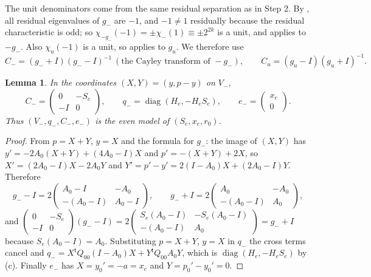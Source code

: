 \documentclass[11pt,oneside,notitlepage]{book}
\numberwithin{equation}{section}
\theoremstyle{plain}
\newtheorem{lemma}[theorem]{Lemma}
\theoremstyle{definition}
\newcommand{\diag}{\operatorname{diag}}
\begin{document}
The unit denominators come from the same residual separation as in Step 2. By , all residual eigenvalues of $g_-$ are $-1$, and $-1\ne1$ residually because the residual characteristic is odd; so $\chi_{-g_-}(-1)=\pm\chi_-(1)\equiv\pm2^{2k}$ is a unit, and  applies to $-g_-$. Also $\chi_u(-1)$ is a unit, so  applies to $g_u$. We therefore use
\[C_-=(g_-+I)(g_--I)^{-1}\ (\text{the Cayley transform of }-g_-),\qquad C_u=(g_u-I)(g_u+I)^{-1}.\]

\begin{lemma}\label{lem:Cminus}
In the coordinates $(X,Y)=(y,p-y)$ on $V_-$,
\[C_-=\begin{pmatrix}0&-S_e\\-I&0\end{pmatrix},\qquad q_-=\diag(H_e,-H_eS_e),\qquad e_-=\begin{pmatrix}x_e\\0\end{pmatrix}.\]
Thus $(V_-,q_-,C_-,e_-)$ is the even model of $(S_e,x_e,r_0)$.
\end{lemma}
\begin{proof}
From $p=X+Y$, $y=X$ and the formula for $g_-$: the image of $(X,Y)$ has $y'=-2A_0(X+Y)+(4A_0-I)X$ and $p'=-(X+Y)+2X$, so $X'=(2A_0-I)X-2A_0Y$ and $Y'=p'-y'=2(I-A_0)X+(2A_0-I)Y$. Therefore
\[g_--I=2\begin{pmatrix}A_0-I&-A_0\\-(A_0-I)&A_0-I\end{pmatrix},\qquad g_-+I=2\begin{pmatrix}A_0&-A_0\\-(A_0-I)&A_0\end{pmatrix},\]
and $\left(\begin{smallmatrix}0&-S_e\\-I&0\end{smallmatrix}\right)(g_--I)=2\left(\begin{smallmatrix}S_e(A_0-I)&-S_e(A_0-I)\\-(A_0-I)&A_0\end{smallmatrix}\right)=g_-+I$ because $S_e(A_0-I)=A_0$. Substituting $p=X+Y$, $y=X$ in $q_-$ the cross terms cancel and $q_-=X^{\mathsf t}Q_{00}(I-A_0)X+Y^{\mathsf t}Q_{00}A_0Y$, which is $\diag(H_e,-H_eS_e)$ by (c). Finally $e_-$ has $X=y_0'=-a=x_e$ and $Y=p_0'-y_0'=0$.
\end{proof}
\end{document}
